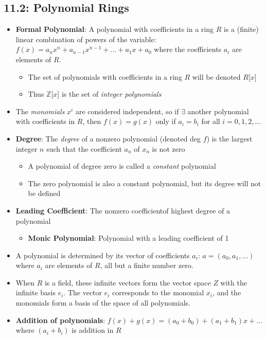 \documentclass[12pt]{article}
\begin{document}
\subsection*{11.2: Polynomial Rings}
\begin{itemize}
  \item \textbf{Formal Polynomial}: A polynomial with coefficients in a ring $R$ is a (finite) linear combination of powers of the variable: $f(x) = a_nx^n + a_{n-1}x^{n-1} + ... + a_1x + a_0$ where the coefficients $a_i$ are elements of $R$.
  \begin{itemize}
    \item The set of polynomials with coefficients in a ring $R$ will be denoted $R$[$x$]
    \item Thus $\mathbb{Z}$[$x$] is the set of \textit{integer polynomials}
  \end{itemize}
  \item The \textit{monomials} $x^i$ are considered independent, so if $\exists$ another polynomial with coefficients in $R$, then $f(x) = g(x)$ only if $a_i = b_i$ for all $i = 0, 1, 2, ...$
  \item \textbf{Degree}: The \textit{degree} of a nonzero polynomial (denoted deg $f$) is the largest integer $n$ such that the coefficient $a_n$ of $x_n$ is not zero
  \begin{itemize}
    \item A polynomial of degree zero is called a \textit{constant} polynomial
    \item The zero polynomial is also a constant polynomial, but its degree will not be defined
  \end{itemize}
  \item \textbf{Leading Coefficient}: The nonzero coefficientof highest degree of a polynomial
  \begin{itemize}
    \item \textbf{Monic Polynomial}: Polynomial with a leading coefficient of 1
  \end{itemize}
  \item A polynomial is determined by its vector of coefficients $a_i$: $a = (a_0, a_1, ...)$ where $a_i$ are elements of $R$, all but a finite number zero.
  \item When $R$ is a field, these infinite vectors form the vector space $Z$ with the infinite basis $e_i$. The vector $e_i$ corresponds to the monomial $x_i$, and the monomials form a basis of the space of all polynomials.
  \item \textbf{Addition of polynomials}: $f(x) + g(x) = (a_0 + b_0) + (a_1 + b_1)x + ...$ where $(a_i + b_i)$ is addition in $R$

\end{itemize}
\end{document}
